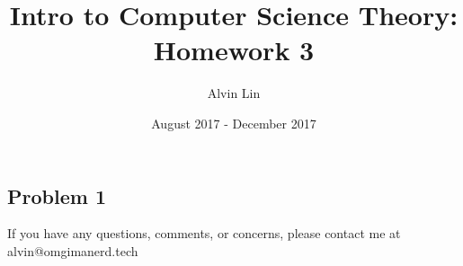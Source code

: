 \documentclass[letterpaper, 12pt]{math}
\title{Intro to Computer Science Theory: Homework 3}
\author{Alvin Lin}
\date{August 2017 - December 2017}
\begin{document}
\maketitle

\subsection*{Problem 1}

\begin{center}
  If you have any questions, comments, or concerns, please contact me at
  alvin@omgimanerd.tech
\end{center}
\end{document}
